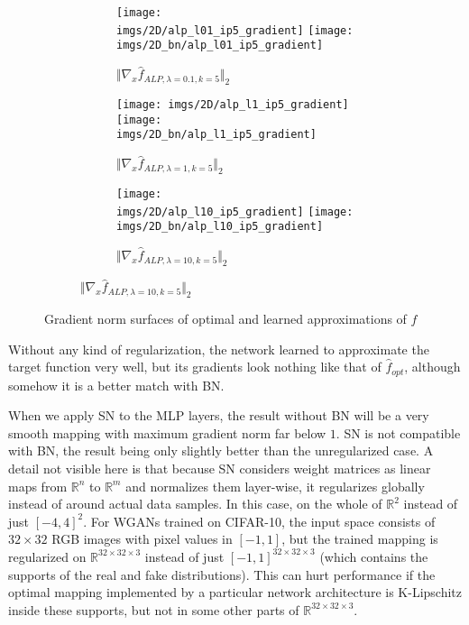 \documentclass{article}
\begin{document}
\begin{figure}[h]
\begin{subfigure}{\linewidth}
\begin{subfigure}{.33\linewidth}
  \texttt{[image: imgs/2D/alp\_l01\_ip5\_gradient]}\hfill
  \texttt{[image: imgs/2D\_bn/alp\_l01\_ip5\_gradient]}
  \caption{$\Vert\nabla_x \hat{f}_{ALP, \lambda=0.1, k=5} \Vert_2$}
\end{subfigure}
\begin{subfigure}{.33\linewidth}
  \texttt{[image: imgs/2D/alp\_l1\_ip5\_gradient]}\hfill
  \texttt{[image: imgs/2D\_bn/alp\_l1\_ip5\_gradient]}
  \caption{$\Vert\nabla_x \hat{f}_{ALP, \lambda=1, k=5} \Vert_2$}
\end{subfigure}
\begin{subfigure}{.33\linewidth}
  \texttt{[image: imgs/2D/alp\_l10\_ip5\_gradient]}\hfill
  \texttt{[image: imgs/2D\_bn/alp\_l10\_ip5\_gradient]}
  \caption{$\Vert\nabla_x \hat{f}_{ALP, \lambda=10, k=5} \Vert_2$}
\end{subfigure}
\end{subfigure}\par

\caption{Gradient norm surfaces of optimal and learned approximations of $f$}
\label{toy_mappings}
\end{figure}

Without any kind of regularization, the network learned to approximate the target function very well, but its gradients look nothing like that of $\hat{f}_{opt}$, although somehow it is a better match with BN.

When we apply SN to the MLP layers, the result without BN will be a very smooth mapping with maximum gradient norm far below $1$. SN is not compatible with BN, the result being only slightly better than the unregularized case. A detail not visible here is that because SN considers weight matrices as linear maps from $\mathbb{R}^n$ to $\mathbb{R}^m$ and normalizes them layer-wise, it regularizes globally instead of around actual data samples. In this case, on the whole of $\mathbb{R}^2$ instead of just $[-4, 4]^2$. For WGANs trained on CIFAR-10, the input space consists of $32 \times 32$ RGB images with pixel values in $[-1, 1]$, but the trained mapping is regularized on $\mathbb{R}^{32 \times 32 \times 3}$ instead of just $[-1, 1]^{32 \times 32 \times 3}$ (which contains the supports of the real and fake distributions). This can hurt performance if the optimal mapping implemented by a particular network architecture is K-Lipschitz inside these supports, but not in some other parts of $\mathbb{R}^{32 \times 32 \times 3}$.
\end{document}
